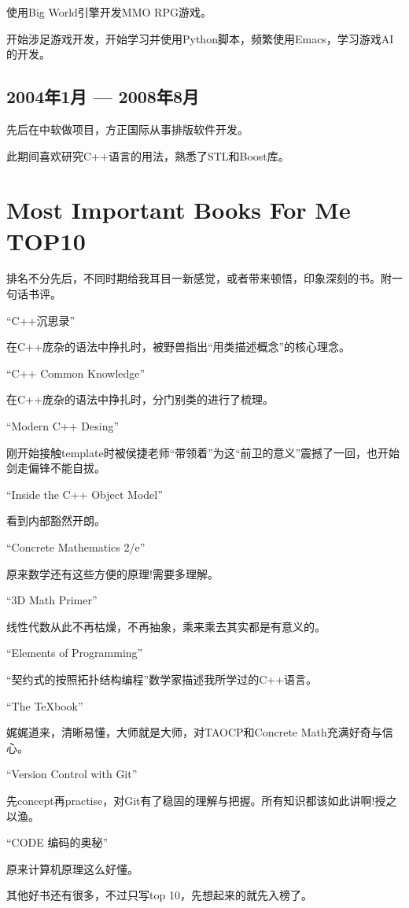\documentclass{article}
\begin{document}
\begin{CJK*}{UTF8}{gbsn}
使用Big World引擎开发MMO RPG游戏。

开始涉足游戏开发，开始学习并使用Python脚本，频繁使用Emacs，学习游戏AI的开发。

\subsection*{2004年1月 --- 2008年8月}

先后在中软做项目，方正国际从事排版软件开发。

此期间喜欢研究C++语言的用法，熟悉了STL和Boost库。

\section*{Most Important Books For Me TOP10}

排名不分先后，不同时期给我耳目一新感觉，或者带来顿悟，印象深刻的书。附一句话书评。

``C++沉思录''

在C++庞杂的语法中挣扎时，被野兽指出``用类描述概念''的核心理念。

``C++ Common Knowledge''

在C++庞杂的语法中挣扎时，分门别类的进行了梳理。

``Modern C++ Desing''

刚开始接触template时被侯捷老师``带领着''为这``前卫的意义''震撼了一回，也开始剑走偏锋不能自拔。

``Inside the C++ Object Model''

看到内部豁然开朗。

``Concrete Mathematics 2/e''

原来数学还有这些方便的原理!需要多理解。

``3D Math Primer''

线性代数从此不再枯燥，不再抽象，乘来乘去其实都是有意义的。

``Elements of Programming''

``契约式的按照拓扑结构编程''数学家描述我所学过的C++语言。

``The \TeX book''

娓娓道来，清晰易懂，大师就是大师，对TAOCP和Concrete Math充满好奇与信心。

``Version Control with Git''

先concept再practise，对Git有了稳固的理解与把握。所有知识都该如此讲啊!授之以渔。

``CODE 编码的奥秘''

原来计算机原理这么好懂。

其他好书还有很多，不过只写top 10，先想起来的就先入榜了。


\end{CJK*}
\end{document}

